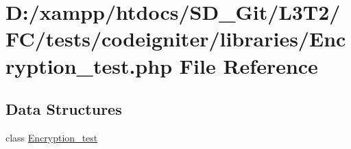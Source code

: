 \hypertarget{tests_2codeigniter_2libraries_2_encryption__test_8php}{}\section{D\+:/xampp/htdocs/\+S\+D\+\_\+\+Git/\+L3\+T2/\+F\+C/tests/codeigniter/libraries/\+Encryption\+\_\+test.php File Reference}
\label{tests_2codeigniter_2libraries_2_encryption__test_8php}
\subsection*{Data Structures}
\begin{DoxyCompactItemize}
\item 
class \hyperlink{class_encryption__test}{Encryption\+\_\+test}
\end{DoxyCompactItemize}
